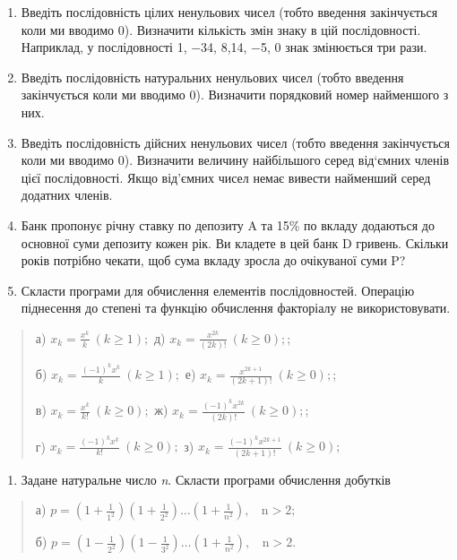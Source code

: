 \documentclass[]{article}
\begin{document}
\begin{enumerate}
\def\labelenumi{\arabic{enumi})}
\item
  Введіть послідовність цілих ненульових чисел (тобто введення
  закінчується коли ми вводимо 0). Визначити кількість змін знаку в цій
  послідовності. Наприклад, у послідовності 1, −34, 8,14, −5, 0 знак
  змінюється три рази.
\item
  Введіть послідовність натуральних ненульових чисел (тобто введення
  закінчується коли ми вводимо 0). Визначити порядковий номер найменшого
  з них.
\item
  Введіть послідовність дійсних ненульових чисел (тобто введення
  закінчується коли ми вводимо 0). Визначити величину найбільшого серед
  від`ємних членів цієї послідовності. Якщо від'ємних чисел немає
  вивести найменший серед додатних членів.
\item
  Банк пропонує річну ставку по депозиту A та 15\% по вкладу додаються
  до основної суми депозиту кожен рік. Ви кладете в цей банк D гривень.
  Скільки років потрібно чекати, щоб сума вкладу зросла до очікуваної
  суми P?
\item
  Скласти програми для обчислення елементів послідовностей. Операцію
  піднесення до степені та функцію обчислення факторіалу не
  використовувати.
\end{enumerate}

\begin{quote}
а) \(x_{k} = \frac{x^{k}}{k}\ (k \geq 1);\) д)
\(x_{k} = \frac{x^{2k}}{(2k)!}\ (k \geq 0);\);

б) \(x_{k} = \frac{( - 1)^{k}x^{k}}{k}\ (k \geq 1);\) е)
\(x_{k} = \frac{x^{2k + 1}}{(2k + 1)!}\ (k \geq 0);\);

в) \(x_{k} = \frac{x^{k}}{k!}\ (k \geq 0);\) ж)
\(x_{k} = \frac{( - 1)^{k}x^{2k}}{(2k)!}\ (k \geq 0);\);

г) \(x_{k} = \frac{( - 1)^{k}x^{k}}{k!}\ (k \geq 0);\) з)
\(x_{k} = \frac{( - 1)^{k}x^{2k + 1}}{(2k + 1)!}\ (k \geq 0);\)
\end{quote}

\begin{enumerate}
\def\labelenumi{\arabic{enumi})}
\item
  Задане натуральне число \emph{n}. Скласти програми обчислення добутків
\end{enumerate}

\begin{quote}
а)
\(p = \left( 1 + \frac{1}{1^{2}} \right)\left( 1 + \frac{1}{2^{2}} \right)\ldots\left( 1 + \frac{1}{n^{2}} \right),\mathrm{\ \ \ \ n > 2};\)

б)
\(p = \left( 1 - \frac{1}{2^{2}} \right)\left( 1 - \frac{1}{3^{2}} \right)\ldots\left( 1 + \frac{1}{n^{2}} \right),\mathrm{\ \ \ \ n > 2.}\)
\end{quote}
\end{document}
